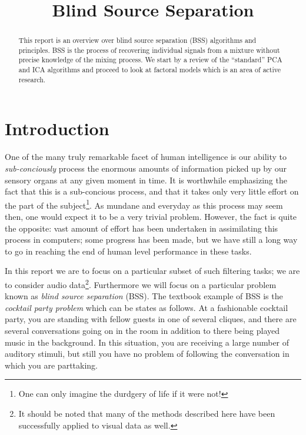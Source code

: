 \documentclass[11pt, oneside, a4paper]{report}
\begin{document}

\title{Blind Source Separation}
\author{}
\date{}    %
\maketitle

\begin{abstract}
  This report is an overview over blind source separation (BSS) algorithms and principles. BSS
  is the process of recovering individual signals from a mixture without precise knowledge of 
  the mixing process. We start by a review of the ``standard'' PCA and ICA algorithms and proceed
  to look at factoral models which is an area of active research.
\end{abstract}

\tableofcontents
\listoffigures

\chapter{Introduction}


One of the many truly remarkable facet of human intelligence is our
ability to \emph{sub-conciously} process the enormous amounts
of information picked up by our sensory organs at any given moment in
time. It is worthwhile emphasizing the fact that this is a
sub-concious process, and that it takes only very little effort on the
part of the subject\footnote{One can only imagine the durdgery of life
if it were not!}. As mundane and everyday as this process may seem
then, one would expect it to be a very trivial problem. However, the
fact is quite the opposite: vast amount of effort has been undertaken in assimilating this process in
computers; some progress has been made, but we have still a long way
to go in reaching the end of human level performance in these tasks.

In this report we are to focus on a particular subset of such
filtering tasks; we are to consider audio data\footnote{It should be
 noted that many of the methods described here have been successfully
applied to visual data as well.}. Furthermore we will focus on a
particular problem known as \emph{blind source separation} (BSS). The
textbook example of BSS is the \emph{cocktail party problem} which can
be states as follows. At a fashionable cocktail party, you are
standing with fellow guests in one of several cliques, and there are
several conversations going on in the room in addition to there being
played music in the background. In this situation, you are receiving a
large number of auditory stimuli, but still you have no problem of
following the conversation in which you are parttaking. 
\end{document}
